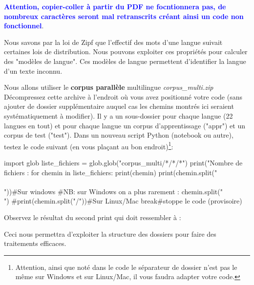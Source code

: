  \vspace{0.5cm}

\textbf{\textcolor{blue}{Attention, copier-coller à partir du PDF ne focntionnera pas, de nombreux caractères seront mal retranscrits créant ainsi un code non fonctionnel}}.

 Nous savons par la loi de Zipf que l'effectif des mots d'une langue suivait certaines lois de distribution.
 Nous pouvons exploiter ces propriétés pour calculer des "modèles de langue".
 Ces modèles de langue permettent d'identifier la langue d'un texte inconnu.

 Nous allons utiliser le \textbf{corpus parallèle} multilingue \textit{corpus\_multi.zip}
 Décompressez cette archive à l'endroit où vous avez positionné votre code (sans ajouter de dossier supplémentaire auquel cas les chemins montrés ici seraient systématiquement à modifier). Il y a un sous-dossier pour chaque langue (22 langues en tout) et pour chaque langue un corpus d'apprentissage ("appr") et un corpus de test ("test").
 Dans un nouveau script Python (notebook ou autre), testez le code suivant (en vous plaçant au bon endroit)\footnote{Attention, ainsi que noté dans le code le séparateur de dossier n'est pas le même sur Windows et sur Linux/Mac, il vous faudra adapter votre code.}:

\begin{python}
import glob
liste_fichiers = glob.glob("corpus_multi/*/*/*")
print("Nombre de fichiers : %
for chemin in liste_fichiers:
  print(chemin)
  print(chemin.split("\\\\"))#Sur windows
  #NB: sur Windows on a plus rarement : chemin.split("\\")
  #print(chemin.split("/"))#Sur Linux/Mac
  break#stoppe le code (provisoire)
\end{python}

Observez le résultat du second print qui doit ressembler à :

\begin{python}
\end{python}

Ceci nous permettra d'exploiter la structure des dossiers pour faire des traitements efficaces.

\vspace{0.5cm}
\vspace{0.5cm}

